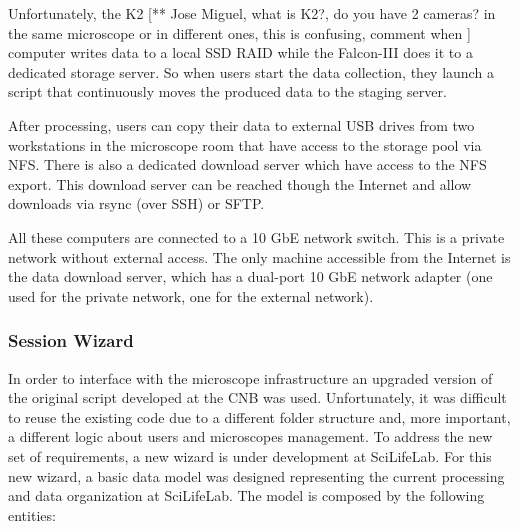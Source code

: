 Unfortunately, the K2 [** Jose Miguel, what is K2?, do you have 2 cameras? in the same microscope or in different ones, this is confusing, comment when ] computer writes data to a local SSD RAID while the Falcon-III does it to a dedicated storage server. %
So when users start the data collection, they launch a script that continuously moves the produced data to the staging server.

After processing, users can copy their data to external USB drives from two workstations in the
microscope room that have access to the storage pool via NFS.
There is also a dedicated download server which have access to the NFS export. This download server 
can be reached though the Internet and allow downloads via rsync (over SSH) or SFTP. 

All these computers are connected to a 10 GbE network switch. This is a private
network without external access. The only machine accessible from the Internet
is the data download server, which has a dual-port 10 GbE network adapter (one
used for the private network, one for the external network). %

\subsubsection{Session Wizard}
In order to interface \scipion with the microscope infrastructure an upgraded version of the original script developed at the CNB was used. Unfortunately, it was difficult to reuse the existing code due to a different folder structure and, more important, a different logic about users and microscopes management. To address the new set of requirements, a new wizard is under development at SciLifeLab. For this new wizard, a basic data model was designed representing the current processing and data organization at SciLifeLab. The model is composed by the following entities:

